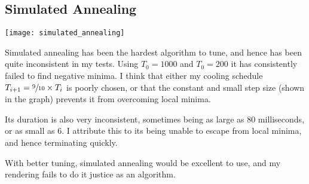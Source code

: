 \documentclass{article}
\begin{document}
\subsection*{Simulated Annealing}
\begin{multicols*}{2}

\begin{center}
    \texttt{[image: simulated\_annealing]}
\end{center}

\columnbreak

Simulated annealing has been the hardest algorithm to tune, and hence has been
quite inconsistent in my tests. Using $T_0 = 1000$ and $T_0 = 200$ it has
consistently failed to find negative minima. I think that either my cooling
schedule $T_{i+1} = \sfrac{9}{10} \times T_i$ is poorly chosen, or that the
constant and small step size (shown in the graph) prevents it from overcoming
local minima.

Its duration is also very inconsistent, sometimes being as large as $80$
milliseconds, or as small as $6$. I attribute this to its being unable to escape
from local minima, and hence terminating quickly.

With better tuning, simulated annealing would be excellent to use, and my
rendering fails to do it justice as an algorithm.

\end{multicols*}
\end{document}

